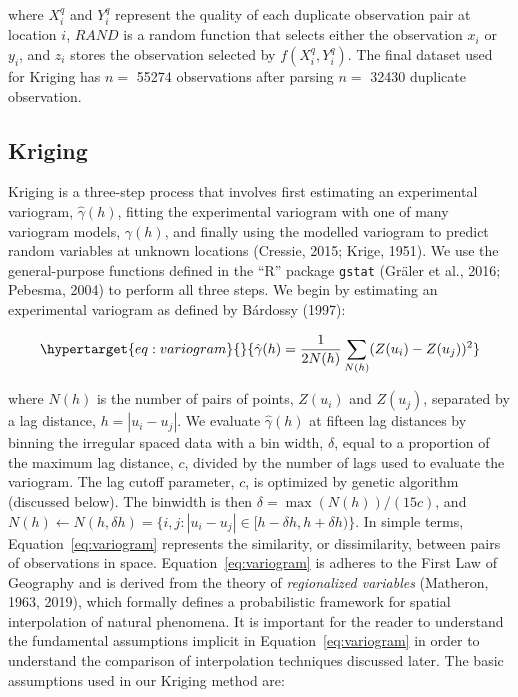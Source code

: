 \documentclass[draft,linenumbers]{agujournal2018}
\begin{document}
where \(X_i^q\) and \(Y_i^q\) represent the quality of each duplicate
observation pair at location \(i\), \(RAND\) is a random function that
selects either the observation \(x_i\) or \(y_i\), and \(z_i\) stores
the observation selected by \(f(X_i^q, Y_i^q)\). The final dataset used
for Kriging has \(n=\) 55274 observations after parsing \(n=\) 32430
duplicate observation.

\subsection{Kriging}

Kriging is a three-step process that involves first estimating an
experimental variogram, \(\hat{\gamma}(h)\), fitting the experimental
variogram with one of many variogram models, \(\gamma(h)\), and finally
using the modelled variogram to predict random variables at unknown
locations (Cressie, 2015; Krige, 1951). We use the general-purpose
functions defined in the ``R'' package \texttt{gstat} (Gräler et al.,
2016; Pebesma, 2004) to perform all three steps. We begin by estimating
an experimental variogram as defined by Bárdossy (1997):

\begin{equation}\protect\hypertarget{eq:variogram}{}{\hat{\gamma}(h) = \frac{1}{2N(h)}\sum_{N(h)}^{}(Z(u_i) - Z(u_j))^2}\label{eq:variogram}\end{equation}

where \(N(h)\) is the number of pairs of points, \(Z(u_i)\) and
\(Z(u_j)\), separated by a lag distance, \(h = |u_i - u_j|\). We
evaluate \(\hat{\gamma}(h)\) at fifteen lag distances by binning the
irregular spaced data with a bin width, \(\delta\), equal to a
proportion of the maximum lag distance, \(c\), divided by the number of
lags used to evaluate the variogram. The lag cutoff parameter, \(c\), is
optimized by genetic algorithm (discussed below). The binwidth is then
\(\delta = \max (N(h))/(15c)\), and
\(N(h) \leftarrow N(h, \delta h) = \{i,j:|u_i - u_j| \in [h - \delta h, h + \delta h)\}\).
In simple terms, Equation~\ref{eq:variogram} represents the similarity,
or dissimilarity, between pairs of observations in space.
Equation~\ref{eq:variogram} is adheres to the First Law of Geography and
is derived from the theory of \emph{regionalized variables} (Matheron,
1963, 2019), which formally defines a probabilistic framework for
spatial interpolation of natural phenomena. It is important for the
reader to understand the fundamental assumptions implicit in
Equation~\ref{eq:variogram} in order to understand the comparison of
interpolation techniques discussed later. The basic assumptions used in
our Kriging method are:
\end{document}
